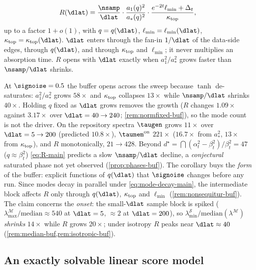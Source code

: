 \begin{corollary}\label{cor:buffer-main}
\begin{equation}\label{eq:R-main}
R(\dlat)=\frac{\nsamp}{\dlat}\cdot\frac{a_1(q)^2}{a_*(q)^2}\cdot\frac{e^{-2t}\ell_{\min}+\Delta_t}{\kappa_{\rm top}},
\end{equation}
up to a factor $1+o(1)$, with $q=q(\dlat)$, $\ell_{\min}=\ell_{\min}(\dlat)$, $\kappa_{\rm top}=\kappa_{\rm top}(\dlat)$. $\dlat$ enters through the fan-in $1/\dlat$ of the data-side edges, through $q(\dlat)$, and through $\kappa_{\rm top}$ and $\ell_{\min}$; it never multiplies an absorption time. $R$ opens with $\dlat$ exactly when $a_1^2/a_*^2$ grows faster than $\nsamp/\dlat$ shrinks.
\end{corollary}
At $\signoise=0.5$ the buffer opens across the sweep because $\tanh$ de-saturates: $a_1^2/a_*^2$ grows $58\times$ and $\kappa_{\rm top}$ collapses $13\times$ while $\nsamp/\dlat$ shrinks $40\times$. Holding $q$ fixed as $\dlat$ grows removes the growth ($R$ changes $1.09\times$ against $3.17\times$ over $\dlat=40\to240$; \cref{rem:normfixed-buf}), so the mode count is not the driver. On the repository spectra $\taugen$ grows $11\times$ over $\dlat=5\to200$ (predicted $10.8\times$), $\taumem^{\rm on}$ $221\times$ ($16.7\times$ from $a_*^2$, $13\times$ from $\kappa_{\rm top}$), and $R$ monotonically, $21\to428$. Beyond $d^\star=\dint(\alpha_t^2-\beta_t^2)/\beta_t^2=47$ ($q\approx\beta_t^2$) \eqref{eq:R-main} predicts a slow $\nsamp/\dlat$ decline, a \emph{conjectural} saturated phase not yet observed (\cref{prop:phases-buf}). The corollary buys the \emph{form} of the buffer: explicit functions of $q(\dlat)$ that $\signoise$ changes before any run. Since modes decay in parallel under \eqref{eq:mode-decay-main}, the intermediate block affects $R$ only through $q(\dlat)$, $\kappa_{\rm top}$ and $\ell_{\min}$ (\cref{rem:nonsequitur-buf}). The claim concerns the \emph{onset}: the small-$\dlat$ sample block is spiked ($\lambda^{\mathcal M}_{\max}/\mathrm{median}\approx540$ at $\dlat=5$, $\approx2$ at $\dlat=200$), so $\lambda^{\mathcal S}_{\min}/\mathrm{median}(\lambda^{\mathcal M})$ \emph{shrinks} $14\times$ while $R$ grows $20\times$; under isotropy $R$ peaks near $\dlat\approx40$ (\cref{rem:median-buf,rem:isotropic-buf}).

\subsection{An exactly solvable linear score model}
\label{sec:theory-linear}

